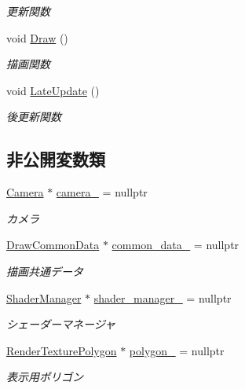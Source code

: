 \begin{DoxyCompactItemize}
\begin{DoxyCompactList}\small\item\em 更新関数 \end{DoxyCompactList}\item 
void \mbox{\hyperlink{class_motion_blur_a8f3c39934e707c4325310873eea3ed45}{Draw}} ()
\begin{DoxyCompactList}\small\item\em 描画関数 \end{DoxyCompactList}\item 
void \mbox{\hyperlink{class_motion_blur_a5fcf35d649a2e1174e5fdaa0ee168a9f}{Late\+Update}} ()
\begin{DoxyCompactList}\small\item\em 後更新関数 \end{DoxyCompactList}\end{DoxyCompactItemize}
\subsection*{非公開変数類}
\begin{DoxyCompactItemize}
\item 
\mbox{\hyperlink{class_camera}{Camera}} $\ast$ \mbox{\hyperlink{class_motion_blur_a1e43ed8f5b0ae775221695807b68ae8f}{camera\+\_\+}} = nullptr
\begin{DoxyCompactList}\small\item\em カメラ \end{DoxyCompactList}\item 
\mbox{\hyperlink{class_draw_common_data}{Draw\+Common\+Data}} $\ast$ \mbox{\hyperlink{class_motion_blur_aecc7c243d6ec641ec5d0bdc7bbeff481}{common\+\_\+data\+\_\+}} = nullptr
\begin{DoxyCompactList}\small\item\em 描画共通データ \end{DoxyCompactList}\item 
\mbox{\hyperlink{class_shader_manager}{Shader\+Manager}} $\ast$ \mbox{\hyperlink{class_motion_blur_a888c174da110fd14c2fcf2ab5c751dda}{shader\+\_\+manager\+\_\+}} = nullptr
\begin{DoxyCompactList}\small\item\em シェーダーマネージャ \end{DoxyCompactList}\item 
\mbox{\hyperlink{class_render_texture_polygon}{Render\+Texture\+Polygon}} $\ast$ \mbox{\hyperlink{class_motion_blur_a14af04a5a96dbdeed47b07bd7bd3d860}{polygon\+\_\+}} = nullptr
\begin{DoxyCompactList}\small\item\em 表示用ポリゴン \end{DoxyCompactList}\end{DoxyCompactItemize}


